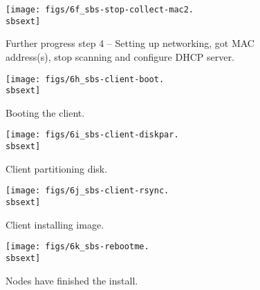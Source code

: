 \begin{figure}[htbp]
  \begin{center}
    \texttt{[image: figs/6f\_sbs-stop-collect-mac2.\\sbsext]}
   \caption{Further progress step 4 -- Setting up networking, got MAC address(s), stop scanning and configure DHCP server.}
    \label{fig:sbs-setup-network3}
  \end{center}
\end{figure}


\setlength{\oddsidemargin}{-0.5in}
\setlength{\evensidemargin}{-0.5in}
\setlength{\textwidth}{7.5in}

\begin{figure}[htbp]
  \begin{center}
    \texttt{[image: figs/6h\_sbs-client-boot.\\sbsext]}
    \caption{Booting the client.}
    \label{fig:sbs-install-boot}
  \end{center}
\end{figure}

\begin{figure}[htbp]
  \begin{center}
    \texttt{[image: figs/6i\_sbs-client-diskpar.\\sbsext]}
    \caption{Client partitioning disk.}
    \label{fig:sbs-install-diskpar}
  \end{center}
\end{figure}
  

\begin{figure}[htbp]
  \begin{center}
    \texttt{[image: figs/6j\_sbs-client-rsync.\\sbsext]}
    \caption{Client installing image.}
    \label{fig:sbs-install-rsync}
  \end{center}
\end{figure}

\begin{figure}[htbp]
  \begin{center}
    \texttt{[image: figs/6k\_sbs-rebootme.\\sbsext]}
    \caption{Nodes have finished the install.}
    \label{fig:sbs-install-finish}
  \end{center}
\end{figure}


